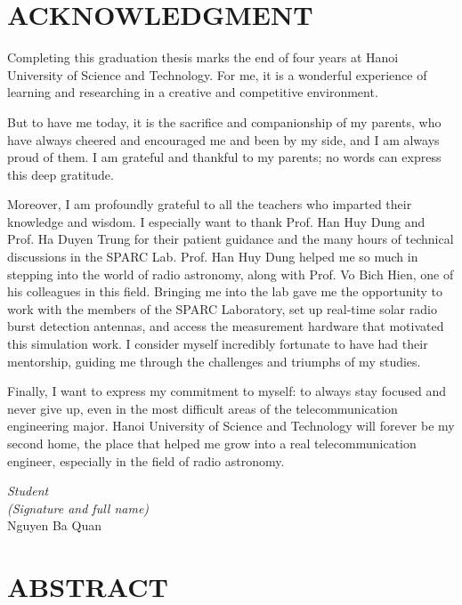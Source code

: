 \documentclass[12pt,a4paper,oneside]{report}
\newcommand{\studentname}{Nguyen Ba Quan}
\begin{document}
\chapter*{ACKNOWLEDGMENT}
\thispagestyle{fancy}

Completing this graduation thesis marks the end of four years at Hanoi University of Science and Technology. For me, it is a wonderful experience of learning and researching in a creative and competitive environment. 

But to have me today, it is the sacrifice and companionship of my parents, who have always cheered and encouraged me and been by my side, and I am always proud of them. I am grateful and thankful to my parents; no words can express this deep gratitude.

Moreover, I am profoundly grateful to all the teachers who imparted their knowledge and wisdom. I especially want to thank Prof. Han Huy Dung and Prof. Ha Duyen Trung for their patient guidance and the many hours of technical discussions in the SPARC Lab. Prof. Han Huy Dung helped me so much in stepping into the world of radio astronomy, along with Prof. Vo Bich Hien, one of his colleagues in this field. Bringing me into the lab gave me the opportunity to work with the members of the SPARC Laboratory, set up real-time solar radio burst detection antennas, and access the measurement hardware that motivated this simulation work. I consider myself incredibly fortunate to have had their mentorship, guiding me through the challenges and triumphs of my studies. 

Finally, I want to express my commitment to myself: to always stay focused and never give up, even in the most difficult areas of the telecommunication engineering major. Hanoi University of Science and Technology will forever be my second home, the place that helped me grow into a real telecommunication engineer, especially in the field of radio astronomy.


\vspace{1cm}
\hfill\begin{minipage}{6cm}
\centering
\textit{Student}\\
\textit{(Signature and full name)}\\[1.6cm]
\studentname
\end{minipage}

\chapter*{ABSTRACT}
\end{document}
